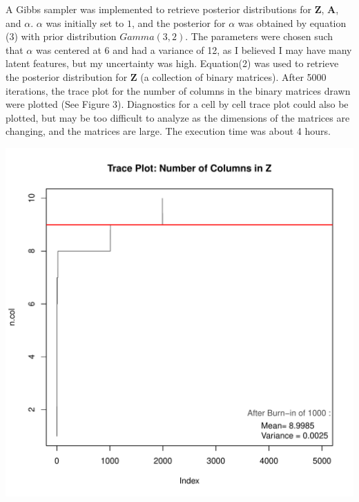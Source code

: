 \noindent
A Gibbs sampler was implemented to retrieve posterior distributions for $\bm Z$,
$\bm A$, and $\alpha$. $\alpha$ was initially set to $1$, and the posterior for
$\alpha$ was obtained by equation (3) with prior distribution $Gamma(3,2)$.
The parameters were chosen such that $\alpha$ was centered at 6 and had a
variance of 12, as I believed I may have many latent features, but my
uncertainty was high.  Equation(2) was used to retrieve the posterior
distribution for $\bm Z$ (a collection of binary matrices). After 5000
iterations, the trace plot for the number of columns in the binary matrices
drawn were plotted (See Figure 3). Diagnostics for a cell by cell trace plot
could also be plotted, but may be too difficult to analyze as the dimensions of
the matrices are changing, and the matrices are large. The execution time was
about 4 hours.\\
\beginmyfig
  \caption{}
  \includegraphics{images/traceplot.pdf}
  \vspace{-15mm}
\endmyfig
\beginmyfig
  \caption{}
